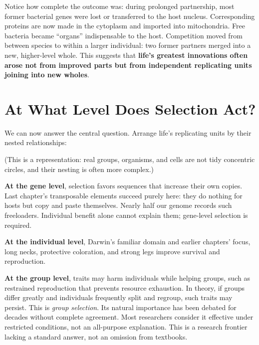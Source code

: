 Notice how complete the outcome was: during prolonged partnership, most former bacterial genes were lost or transferred to the host nucleus. Corresponding proteins are now made in the cytoplasm and imported into mitochondria. Free bacteria became ``organs'' indispensable to the host. Competition moved from between species to within a larger individual: two former partners merged into a new, higher-level whole. This suggests that \textbf{life's greatest innovations often arose not from improved parts but from independent replicating units joining into new wholes}.

\section{At What Level Does Selection Act?}

We can now answer the central question. Arrange life's replicating units by their nested relationships:

\begin{center}
\end{center}

(This is a representation: real groups, organisms, and cells are not tidy concentric circles, and their nesting is often more complex.)

\textbf{At the gene level}, selection favors sequences that increase their own copies. Last chapter's transposable elements succeed purely here: they do nothing for hosts but copy and paste themselves. Nearly half our genome records such freeloaders. Individual benefit alone cannot explain them; gene-level selection is required.

\textbf{At the individual level}, Darwin's familiar domain and earlier chapters' focus, long necks, protective coloration, and strong legs improve survival and reproduction.

\textbf{At the group level}, traits may harm individuals while helping groups, such as restrained reproduction that prevents resource exhaustion. In theory, if groups differ greatly and individuals frequently split and regroup, such traits may persist. This is \emph{group selection}. Its natural importance has been debated for decades without complete agreement. Most researchers consider it effective under restricted conditions, not an all-purpose explanation. This is a research frontier lacking a standard answer, not an omission from textbooks.

